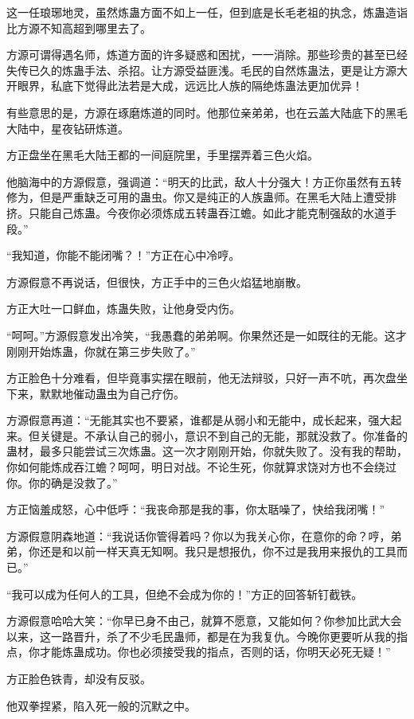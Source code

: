 \begin{this_body}
这一任琅琊地灵，虽然炼蛊方面不如上一任，但到底是长毛老祖的执念，炼蛊造诣比方源不知高超到哪里去了。

方源可谓得遇名师，炼道方面的许多疑惑和困扰，一一消除。那些珍贵的甚至已经失传已久的炼蛊手法、杀招。让方源受益匪浅。毛民的自然炼蛊法，更是让方源大开眼界，私底下觉得此法若是大成，远远比人族的隔绝炼蛊法更加优异！

有些意思的是，方源在琢磨炼道的同时。他那位亲弟弟，也在云盖大陆底下的黑毛大陆中，星夜钻研炼道。

方正盘坐在黑毛大陆王都的一间庭院里，手里摆弄着三色火焰。

他脑海中的方源假意，强调道：“明天的比武，敌人十分强大！方正你虽然有五转修为，但是严重缺乏可用的蛊虫。你又是纯正的人族蛊师。在黑毛大陆上遭受排挤。只能自己炼蛊。今夜你必须炼成五转蛊吞江蟾。如此才能克制强敌的水道手段。”

“我知道，你能不能闭嘴？！”方正在心中冷哼。

方源假意不再说话，但很快，方正手中的三色火焰猛地崩散。

方正大吐一口鲜血，炼蛊失败，让他身受内伤。

“呵呵。”方源假意发出冷笑，“我愚蠢的弟弟啊。你果然还是一如既往的无能。这才刚刚开始炼蛊，你就在第三步失败了。”

方正脸色十分难看，但毕竟事实摆在眼前，他无法辩驳，只好一声不吭，再次盘坐下来，默默地催动蛊虫为自己疗伤。

方源假意再道：“无能其实也不要紧，谁都是从弱小和无能中，成长起来，强大起来。但关键是。不承认自己的弱小，意识不到自己的无能，那就没救了。你准备的蛊材，最多只能尝试三次炼蛊。这一次才刚刚开始，你就失败了。没有我的帮助，你如何能炼成吞江蟾？呵呵，明日对战。不论生死，你就算求饶对方也不会绕过你。你的确是没救了。”

方正恼羞成怒，心中低呼：“我丧命那是我的事，你太聒噪了，快给我闭嘴！”

方源假意阴森地道：“我说话你管得着吗？你以为我关心你，在意你的命？哼，弟弟，你还是和以前一样天真无知啊。我只是想报仇，你不过是我用来报仇的工具而已。”

“我可以成为任何人的工具，但绝不会成为你的！”方正的回答斩钉截铁。

方源假意哈哈大笑：“你早已身不由己，就算不愿意，又能如何？你参加比武大会以来，这一路晋升，杀了不少毛民蛊师，都是在为我复仇。今晚你更要听从我的指点，你才能炼蛊成功。你也必须接受我的指点，否则的话，你明天必死无疑！”

方正脸色铁青，却没有反驳。

他双拳捏紧，陷入死一般的沉默之中。


\end{this_body}

